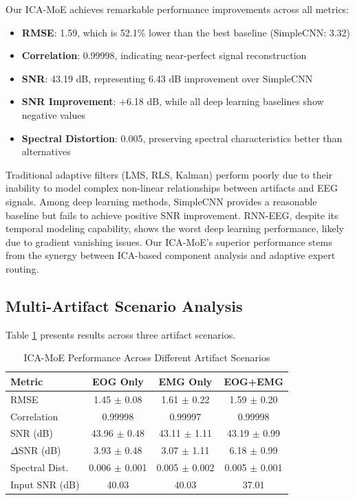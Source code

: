 \documentclass[journal]{IEEEtran}
\begin{document}
Our ICA-MoE achieves remarkable performance improvements across all metrics:
\begin{itemize}
\item \textbf{RMSE}: 1.59, which is 52.1\% lower than the best baseline (SimpleCNN: 3.32)
\item \textbf{Correlation}: 0.99998, indicating near-perfect signal reconstruction
\item \textbf{SNR}: 43.19 dB, representing 6.43 dB improvement over SimpleCNN
\item \textbf{SNR Improvement}: +6.18 dB, while all deep learning baselines show negative values
\item \textbf{Spectral Distortion}: 0.005, preserving spectral characteristics better than alternatives
\end{itemize}

Traditional adaptive filters (LMS, RLS, Kalman) perform poorly due to their inability to model complex non-linear relationships between artifacts and EEG signals. Among deep learning methods, SimpleCNN provides a reasonable baseline but fails to achieve positive SNR improvement. RNN-EEG, despite its temporal modeling capability, shows the worst deep learning performance, likely due to gradient vanishing issues. Our ICA-MoE's superior performance stems from the synergy between ICA-based component analysis and adaptive expert routing.

\subsection{Multi-Artifact Scenario Analysis}

Table \ref{tab:scenario_results} presents results across three artifact scenarios.

\begin{table}[!t]
\centering
\caption{ICA-MoE Performance Across Different Artifact Scenarios}
\label{tab:scenario_results}
\begin{tabular}{lccc}
\toprule
\textbf{Metric} & \textbf{EOG Only} & \textbf{EMG Only} & \textbf{EOG+EMG} \\
\midrule
RMSE & 1.45 $\pm$ 0.08 & 1.61 $\pm$ 0.22 & 1.59 $\pm$ 0.20 \\
Correlation & 0.99998 & 0.99997 & 0.99998 \\
SNR (dB) & 43.96 $\pm$ 0.48 & 43.11 $\pm$ 1.11 & 43.19 $\pm$ 0.99 \\
$\Delta$SNR (dB) & 3.93 $\pm$ 0.48 & 3.07 $\pm$ 1.11 & 6.18 $\pm$ 0.99 \\
Spectral Dist. & 0.006 $\pm$ 0.001 & 0.005 $\pm$ 0.002 & 0.005 $\pm$ 0.001 \\
\midrule
Input SNR (dB) & 40.03 & 40.03 & 37.01 \\
\bottomrule
\end{tabular}
\end{table}
\end{document}
